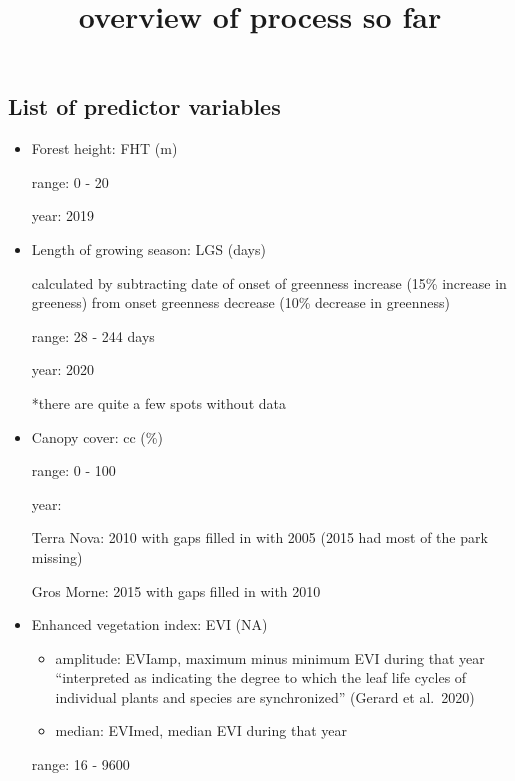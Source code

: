 \documentclass[
  letterpaper,
  DIV=11,
  numbers=noendperiod]{scrartcl}
\title{overview of process so far}
\author{}
\date{}
\begin{document}
\maketitle
\ifdefined\Shaded\renewenvironment{Shaded}{\begin{tcolorbox}[frame hidden, breakable, borderline west={3pt}{0pt}{shadecolor}, boxrule=0pt, interior hidden, sharp corners, enhanced]}{\end{tcolorbox}}\fi

\hypertarget{list-of-predictor-variables}{%
\subsection{List of predictor
variables}\label{list-of-predictor-variables}}

\begin{itemize}
\item
  Forest height: FHT (m)

  range: 0 - 20

  year: 2019
\item
  Length of growing season: LGS (days)

  calculated by subtracting date of onset of greenness increase (15\%
  increase in greeness) from onset greenness decrease (10\% decrease in
  greenness)

  range: 28 - 244 days

  year: 2020

  *there are quite a few spots without data
\item
  Canopy cover: cc (\%)

  range: 0 - 100

  year:

  Terra Nova: 2010 with gaps filled in with 2005 (2015 had most of the
  park missing)

  Gros Morne: 2015 with gaps filled in with 2010
\item
  Enhanced vegetation index: EVI (NA)

  \begin{itemize}
  \item
    amplitude: EVIamp, maximum minus minimum EVI during that year
    ``interpreted as indicating the degree to which the leaf life cycles
    of individual plants and species are synchronized'' (Gerard et
    al.~2020)
  \item
    median: EVImed, median EVI during that year
  \end{itemize}

  range: 16 - 9600


\end{itemize}
\end{document}
